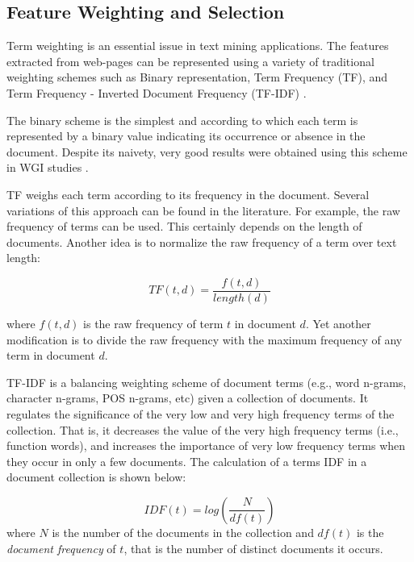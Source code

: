 \subsection{Feature Weighting and Selection}

Term weighting is an essential issue in text mining applications. The features extracted from web-pages can be represented using a variety of  traditional weighting schemes such as Binary representation, Term Frequency (TF), and Term Frequency - Inverted Document Frequency (TF-IDF) . 

The binary scheme is the simplest and according to which each term is represented by a binary value indicating its occurrence or absence in the document. Despite its naivety, very good results were obtained using this scheme in WGI studies .

TF weighs each term according to its frequency in the document. Several variations of this approach can be found in the literature. For example, the raw frequency of terms can be used. This certainly depends on the length of documents. Another idea is to normalize the raw frequency of a term over text length:

\begin{equation}
    TF(t,d) = \frac{f(t,d)}{length(d)}
\end{equation}

\nointend where $f(t,d)$ is the raw frequency of term $t$ in document $d$. Yet another modification is to divide the raw frequency with the maximum frequency of any term in document $d$.

TF-IDF is a balancing weighting scheme of document terms (e.g., word n-grams, character n-grams, POS n-grams, etc) given a collection of documents. It regulates the significance of the very low and very high frequency terms of the collection. That is, it decreases the value of the very high frequency terms (i.e., function words), and increases the importance of very low frequency terms when they occur in only a few documents. The calculation of a terms IDF in a document collection is shown below:
 
 \begin{equation}\label{chap:relevant_work:eq:idf}
 	IDF(t) = log \left( \frac{N}{df(t)} \right)
 \end{equation}
\noindent
where $N$ is the number of the documents in the collection and $df(t)$ is the \textit{document frequency} of $t$, that is the number of distinct documents it occurs. 

